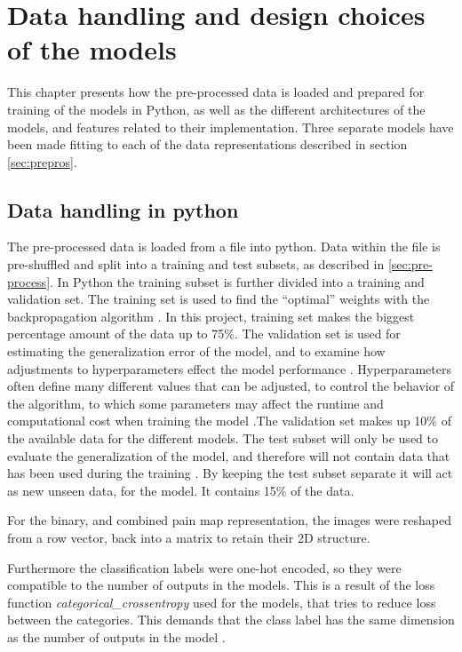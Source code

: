 \section{Data handling and design choices of the models}
This chapter presents how the pre-processed data is loaded and prepared for training of the models in Python, as well as the different architectures of the models, and features related to their implementation. Three separate models have been made fitting to each of the data representations described in section \ref{sec:prepros}. 

\subsection{Data handling in python}
The pre-processed data is loaded from a  file into python.
Data within the file is pre-shuffled and split into a training and test subsets, as described in \autoref{sec:pre-process}. 
In Python the training subset is further divided into a training and validation set. 
The training set is used to find the “optimal” weights with the backpropagation algorithm \citep{Bengio2012}. In this project, training set makes the biggest percentage amount of the data up to 75\%.
The validation set is used for estimating the generalization error of the model, and to examine how adjustments to hyperparameters effect the model performance \citep{Duda2000}. Hyperparameters often define many different values that can be adjusted, to control the behavior of the algorithm, to which some parameters may affect the runtime and computational cost when training the model \citep{Goodfellow2016}.The validation set makes up 10\% of the available data for the different models.
The test subset will only be used to evaluate the generalization of the model, and therefore will not contain data that has been used during the training \citep{Duda2000}.
By keeping the test subset separate it will act as new unseen data, for the model. It contains 15\% of the data.

For the binary, and combined pain map representation, the images were reshaped from a row vector, back into a matrix to retain their 2D structure. 

Furthermore the classification labels were one-hot encoded, so they were compatible to the number of outputs in the models. This is a result of the loss function \textit{categorical_crossentropy} used for the models, that tries to reduce loss between the categories. This demands that the class label has the same dimension as the number of outputs in the model \citep{Chollet2015}.    

